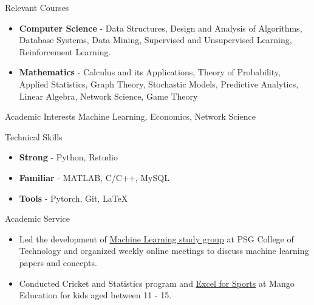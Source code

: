 \documentclass{resume} %
\begin{document}
\begin{rSection}{Relevant Courses}
\begin{itemize}[leftmargin=*]
\itemsep -0.5em 
\item \textbf{Computer Science} - Data Structures, Design and Analysis of Algorithms, Database Systems, Data Mining, Supervised and Unsupervised Learning, Reinforcement Learning.
\item \textbf{Mathematics} - Calculus and its Applications, Theory of Probability, Applied Statistics, Graph Theory, Stochastic Models, Predictive Analytics, Linear Algebra, Network Science\footnotemark[1], Game Theory\footnotemark[1]
\end{itemize}
\end{rSection}

\begin{rSection}{Academic Interests}
Machine Learning, Economics, Network Science
\end{rSection}

\begin{rSection}{Technical Skills}
\begin{itemize}[leftmargin=*]
\itemsep -0.5em 
\item \textbf{Strong} - Python, Rstudio
\item \textbf{Familiar} - MATLAB, C/C++, MySQL
\item \textbf{Tools} - Pytorch, Git, \LaTeX
\end{itemize}
\end{rSection}

\begin{rSection}{Academic Service}
\vspace*{0.1in}
\begin{itemize}[leftmargin=*]
\item Led the development of \href{https://groups.google.com/g/psg-ml-seminar}{Machine Learning study group} at PSG College of Technology and organized weekly online meetings to discuss machine learning papers and concepts.
\item Conducted Cricket and Statistics program and \href{https://themango.co/programs/excel-with-sports/}{Excel for Sports} at Mango Education for kids aged between 11 - 15.
\end{itemize}
\end{rSection}
\end{document}

